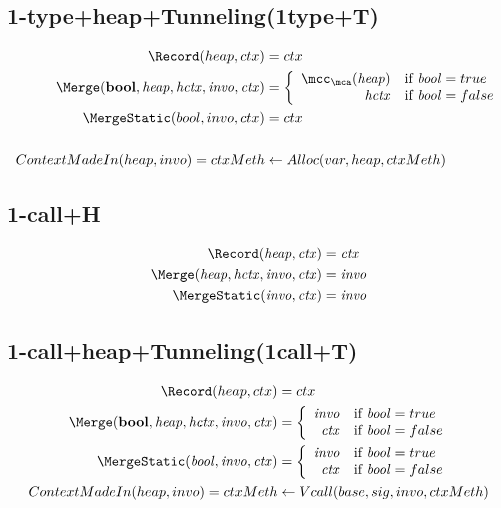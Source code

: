 \subsection{1-type+heap+Tunneling(1type+T)}
\begin{align*}
\Record (heap, ctx) &= ctx\\
\Merge ({\it \textbf{bool}, heap, hctx, invo, ctx}) &= \left\{
\begin{array}{rl}
{\it \mcc_{\mca}(heap)} & \mbox{if}~{\it bool} = true \\
{\it hctx} & \mbox{if}~{\it bool} = false
\end{array}
\right.\\
\MergeStatic (bool, invo, ctx)&=ctx\\\\
ContextMadeIn (heap ,invo)=ctxMeth&\leftarrow Alloc(var, heap, ctxMeth)\\
\end{align*}

\subsection{1-call+H}

\begin{align*}
\Record ({\it heap}, {\it ctx}) &= {\it ctx}\\
\Merge ({\it heap, hctx, invo, ctx}) &= {\it invo} \\
\MergeStatic ({\it invo}, {\it ctx})&={\it invo}\\
\end{align*}

\subsection{1-call+heap+Tunneling(1call+T)}
\begin{align*}
\Record (heap, ctx) &= ctx\\
\Merge ({\it \textbf{bool}, heap, hctx, invo, ctx}) &= \left\{
\begin{array}{rl}
{\it invo} & \mbox{if}~{\it bool} = true \\
{\it ctx} & \mbox{if}~{\it bool} = false
\end{array}
\right.\\
\MergeStatic ({\it {bool}, invo, ctx}) &= \left\{
\begin{array}{rl}
{\it invo} & \mbox{if}~{\it bool} = true \\
{\it ctx} & \mbox{if}~{\it bool} = false
\end{array}
\right.\\
ContextMadeIn (heap ,invo)=ctxMeth&\leftarrow Vcall(base, sig, invo, ctxMeth)\\
\end{align*}




